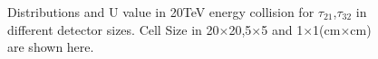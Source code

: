 \begin{figure}
\begin{center}
{   }

\end{center}
\caption{Distributions and U value in 20TeV energy collision for $\tau_{21}$,$\tau_{32}$ in different detector sizes. Cell Size in 20$\times$20,5$\times$5 and 1$\times$1(cm$\times$cm) are shown here.}
\label{fig:cluster_tau21_tau32}
\end{figure}


